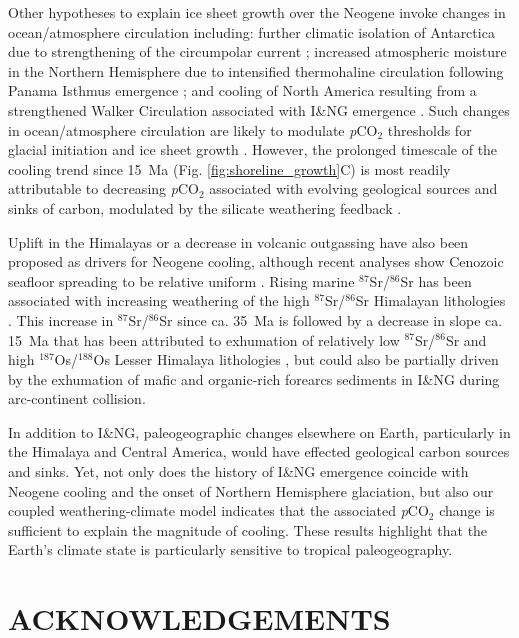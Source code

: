 \documentclass[11pt,letterpaper]{article}
\newcommand{\SrSr}{$^{87}$Sr/$^{86}$Sr\xspace}
\newcommand{\OsOs}{$^{187}$Os/$^{188}$Os\xspace}
\newcommand{\pCOtwo}{\textit{p}CO$_{2}$\xspace}
\begin{document}
Other hypotheses to explain ice sheet growth over the Neogene invoke changes in ocean/atmosphere circulation including: further climatic isolation of Antarctica due to strengthening of the circumpolar current \cite{Shevenell2004a}; increased atmospheric moisture in the Northern Hemisphere due to intensified thermohaline circulation following Panama Isthmus emergence \cite{Haug1998a}; and cooling of North America resulting from a strengthened Walker Circulation associated with I\&NG emergence \cite{Molnar2015a}. Such changes in ocean/atmosphere circulation are likely to modulate \pCOtwo thresholds for glacial initiation and ice sheet growth \cite{DeConto2008a}. However, the prolonged timescale of the cooling trend since 15~Ma (Fig. \ref{fig:shoreline_growth}C) is most readily attributable to decreasing \pCOtwo associated with evolving geological sources and sinks of carbon, modulated by the silicate weathering feedback \cite{Walker1981a, Raymo1991a, Berner1997a, Kump1997a, Berner2001a}.

Uplift in the Himalayas \cite{Raymo1988a} or a decrease in volcanic outgassing \cite{Berner1983a} have also been proposed as drivers for Neogene cooling, although recent analyses show Cenozoic seafloor spreading to be relative uniform \cite{Rowan2016a}. Rising marine \SrSr has been associated with increasing weathering of the high \SrSr Himalayan lithologies \cite{Raymo1992a}. This increase in \SrSr since ca. 35~Ma is followed by a decrease in slope ca. 15~Ma that has been attributed to exhumation of relatively low \SrSr and high \OsOs Lesser Himalaya lithologies \cite{Myrow2015a, Colleps2018a}, but could also be partially driven by the exhumation of mafic and organic-rich forearcs sediments in I\&NG during arc-continent collision.

In addition to I\&NG, paleogeographic changes elsewhere on Earth, particularly in the Himalaya and Central America, would have effected geological carbon sources and sinks. Yet, not only does the history of I\&NG emergence coincide with Neogene cooling and the onset of Northern Hemisphere glaciation, but also our coupled weathering-climate model indicates that the associated \pCOtwo change is sufficient to explain the magnitude of cooling. These results highlight that the Earth's climate state is particularly sensitive to tropical paleogeography.

\section*{ACKNOWLEDGEMENTS \label{sec:ACKNOWLEDGEMENTS}}
\end{document}
